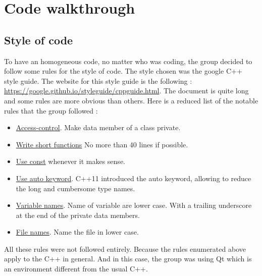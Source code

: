 \section{Code walkthrough}

\subsection{Style of code}
To have an homogeneous code, no matter who was coding, the group decided to follow some rules for the style of code. The style chosen was the google C++ style guide. The website for this style guide is the following : \url{https://google.github.io/styleguide/cppguide.html}.
The document is quite long and some rules are more obvious than others. Here is a reduced list of the notable rules that the group followed :
\begin{itemize}
	\item \href{https://google.github.io/styleguide/cppguide.html#Access_Control}{Access-control}. Make data member of a class private. 
	\item \href{https://google.github.io/styleguide/cppguide.html#Write_Short_Functions}{Write short functions} No more than 40 lines if possible.
	\item \href{https://google.github.io/styleguide/cppguide.html#Use_of_const}{Use const} whenever it makes sense.
	\item \href{https://google.github.io/styleguide/cppguide.html#auto}{Use auto keyword}. C++11 introduced the auto keyword, allowing to reduce the long and cumbersome type names.
	\item \href{https://google.github.io/styleguide/cppguide.html#Variable_Names}{Variable names}. Name of variable are lower case. With a trailing underscore at the end of the private data members.
	\item \href{https://google.github.io/styleguide/cppguide.html#File_Names}{File names}. Name the file in lower case.
\end{itemize}
All these rules were not followed entirely. Because the rules enumerated above apply to the C++ in general. And in this case, the group was using Qt which is an environment different from the usual C++.\\


